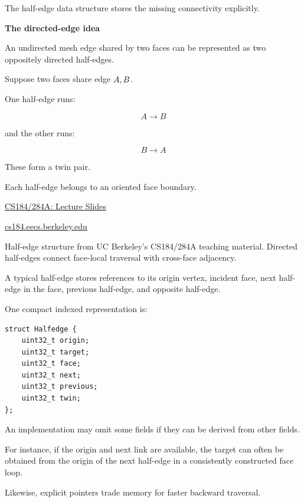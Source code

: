 The half-edge data structure stores the missing connectivity explicitly.

\textbf{The directed-edge idea}

An undirected mesh edge shared by two faces can be represented as two oppositely directed half-edges.

Suppose two faces share edge \(\\{A,B\\}\).

One half-edge runs:

\[
A\rightarrow B
\]

and the other runs:

\[
B\rightarrow A
\]

These form a twin pair.

Each half-edge belongs to an oriented face boundary.

\href{https://images.openai.com/static-rsc-4/LdXoMoReUJDWQboTFXVax9msgYiH4uAONkFXepPt9uBAax1LtEbQnjRwODfP4xjW6xhyN2dqUlCjk4_q5ugu0OYA8ggDScUVP5zv9ajTYRBc4W7Y_7wK4JjygNR75J6KtdaA5pZ5rI45muKmzksWb0_Y8eLucg-e4t2K7mYP_l0?purpose=inline}{CS184/284A: Lecture Slides}

\href{https://cs184.eecs.berkeley.edu/sp24/lecture/8-24/mesh-processing-and-geometry-pro?utm_source=chatgpt.com}{cs184.eecs.berkeley.edu}

Half-edge structure from UC Berkeley's CS184/284A teaching material. Directed half-edges connect face-local traversal with cross-face adjacency.

A typical half-edge stores references to its origin vertex, incident face, next half-edge in the face, previous half-edge, and opposite half-edge.

One compact indexed representation is:

\begin{verbatim}
struct Halfedge {
    uint32_t origin;
    uint32_t target;
    uint32_t face;
    uint32_t next;
    uint32_t previous;
    uint32_t twin;
};
\end{verbatim}

An implementation may omit some fields if they can be derived from other fields.

For instance, if the origin and next link are available, the target can often be obtained from the origin of the next half-edge in a consistently constructed face loop.

Likewise, explicit  pointers trade memory for faster backward traversal.

